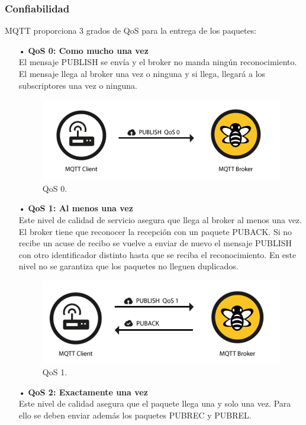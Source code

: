 \documentclass[12pt, twoside]{book}
\begin{document}
\subsubsection*{Confiabilidad}
MQTT proporciona 3 grados de QoS para la entrega de los paquetes:
\begin{itemize}
\item[•]\textbf{QoS 0: Como mucho una vez}\\
El mensaje PUBLISH se envía y el broker no manda ningún reconocimiento. El mensaje llega al broker una vez o ninguna y si llega, llegará a los subscriptores una vez o ninguna.
\begin{figure}[h!]
\centering
\includegraphics[scale=0.3]{images/qos0}
\caption{QoS 0.\cite{hive}}\label{L406}
\end{figure}
\item[•]\textbf{QoS 1: Al menos una vez}\\
Este nivel de calidad de servicio asegura que llega al broker al menos una vez. El broker tiene que reconocer la recepción con un paquete PUBACK. Si no recibe un acuse de recibo se vuelve a enviar de nuevo el mensaje PUBLISH con otro identificador distinto hasta que se reciba el reconocimiento. En este nivel no se garantiza que los paquetes no lleguen duplicados.
\begin{figure}[H]
\centering
\includegraphics[scale=0.3]{images/qos1}
\caption{QoS 1.\cite{hive}}\label{L407}
\end{figure}
\item[•] \textbf{QoS 2: Exactamente una vez}\\
Este nivel de calidad asegura que el paquete llega una y solo una vez. Para ello se deben enviar además los paquetes PUBREC y PUBREL.

\end{itemize}
\end{document}
